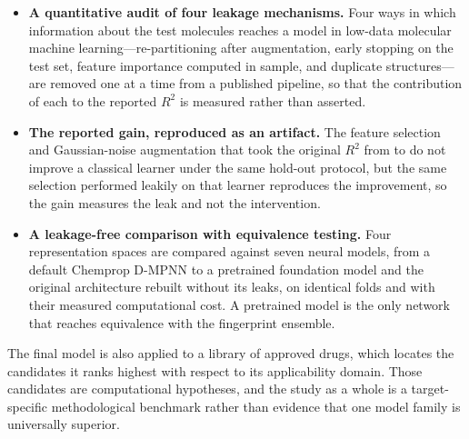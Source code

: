 \begin{itemize}
	\item \textbf{A quantitative audit of four leakage mechanisms.} Four ways in which information about the test molecules reaches a
	model in low-data molecular machine learning---re-partitioning after augmentation, early stopping on the test set,
	feature importance computed in sample, and duplicate structures---are removed one at a time from a published
	pipeline, so that the contribution of each to the reported $R^2$ is measured rather than asserted.

	\item \textbf{The reported gain, reproduced as an artifact.} The feature selection and Gaussian-noise augmentation
	that took the original $R^2$ from \PaperBaselineRTwo{} to \PaperFinalRTwo{} do not improve a classical learner under
	the same hold-out protocol, but the same selection performed leakily on that learner reproduces the improvement, so
	the gain measures the leak and not the intervention.

	\item \textbf{A leakage-free comparison with equivalence testing.} Four representation spaces are compared against
	seven neural models, from a default Chemprop D-MPNN to a pretrained foundation model and the original architecture
	rebuilt without its leaks, on identical folds and with their measured computational cost. A pretrained model is the
	only network that reaches equivalence with the fingerprint ensemble.
\end{itemize}

The final model is also applied to a library of approved drugs, which locates the candidates it ranks highest with
respect to its applicability domain. Those candidates are computational hypotheses, and the study as a whole is a
target-specific methodological benchmark rather than evidence that one model family is universally superior.
